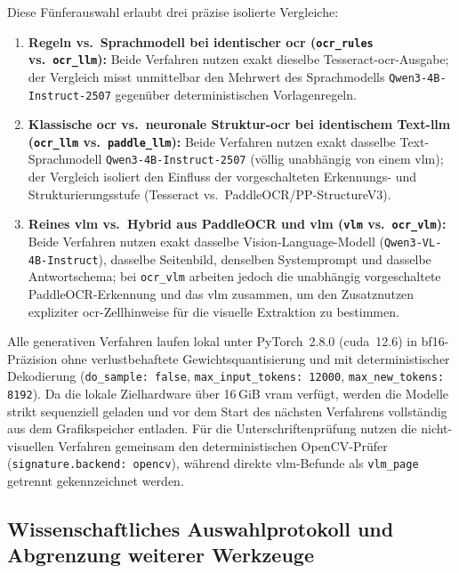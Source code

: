 Diese Fünferauswahl erlaubt drei präzise isolierte Vergleiche:
\begin{enumerate}
  \item \textbf{Regeln vs.\ Sprachmodell bei identischer \ac{ocr} (\texttt{ocr\_rules} vs.\ \texttt{ocr\_llm}):} Beide Verfahren nutzen exakt dieselbe Tesseract-\ac{ocr}-Ausgabe; der Vergleich misst unmittelbar den Mehrwert des Sprachmodells \texttt{Qwen3-4B-Instruct-2507} gegenüber deterministischen Vorlagenregeln.
  \item \textbf{Klassische \ac{ocr} vs.\ neuronale Struktur-\ac{ocr} bei identischem Text-\ac{llm} (\texttt{ocr\_llm} vs.\ \texttt{paddle\_llm}):} Beide Verfahren nutzen exakt dasselbe Text-Sprachmodell \texttt{Qwen3-4B-Instruct-2507} (völlig unabhängig von einem \ac{vlm}); der Vergleich isoliert den Einfluss der vorgeschalteten Erkennungs- und Strukturierungsstufe (Tesseract vs.\ PaddleOCR/PP-StructureV3).
  \item \textbf{Reines \ac{vlm} vs.\ Hybrid aus PaddleOCR und \ac{vlm} (\texttt{vlm} vs.\ \texttt{ocr\_vlm}):} Beide Verfahren nutzen exakt dasselbe Vision-Language-Modell (\texttt{Qwen3-VL-4B-Instruct}), dasselbe Seitenbild, denselben Systemprompt und dasselbe Antwortschema; bei \texttt{ocr\_vlm} arbeiten jedoch die unabhängig vorgeschaltete PaddleOCR-Erkennung und das \ac{vlm} zusammen, um den Zusatznutzen expliziter \ac{ocr}-Zellhinweise für die visuelle Extraktion zu bestimmen.
\end{enumerate}

Alle generativen Verfahren laufen lokal unter PyTorch~2.8.0 (\ac{cuda}~12.6) in \ac{bf16}-Präzision ohne verlustbehaftete Gewichtsquantisierung und mit deterministischer Dekodierung (\texttt{do\_sample: false}, \texttt{max\_input\_tokens: 12000}, \texttt{max\_new\_tokens: 8192}). Da die lokale Zielhardware über \mbox{16\,GiB} \ac{vram} verfügt, werden die Modelle strikt sequenziell geladen und vor dem Start des nächsten Verfahrens vollständig aus dem Grafikspeicher entladen. Für die Unterschriftenprüfung nutzen die nicht-visuellen Verfahren gemeinsam den deterministischen OpenCV-Prüfer (\texttt{signature.backend: opencv}), während direkte \ac{vlm}-Befunde als \texttt{vlm\_page} getrennt gekennzeichnet werden.

\subsection{Wissenschaftliches Auswahlprotokoll und Abgrenzung weiterer Werkzeuge}
\label{subsec:auswahlprotokoll}

